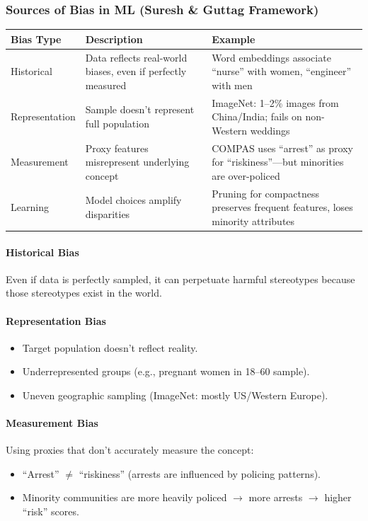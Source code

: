 \subsubsection*{Sources of Bias in ML (Suresh \& Guttag Framework)}

\begin{center}
\renewcommand{\arraystretch}{1.4}
\begin{tabular}{@{} l p{5cm} p{5cm} @{}}
\toprule
\textbf{Bias Type} & \textbf{Description} & \textbf{Example} \\
\midrule
Historical & Data reflects real-world biases, even if perfectly measured & Word embeddings associate ``nurse'' with women, ``engineer'' with men \\
Representation & Sample doesn't represent full population & ImageNet: 1--2\% images from China/India; fails on non-Western weddings \\
Measurement & Proxy features misrepresent underlying concept & COMPAS uses ``arrest'' as proxy for ``riskiness''---but minorities are over-policed \\
Learning & Model choices amplify disparities & Pruning for compactness preserves frequent features, loses minority attributes \\
\bottomrule
\end{tabular}
\end{center}

\paragraph*{Historical Bias}
Even if data is perfectly sampled, it can perpetuate harmful stereotypes because those stereotypes exist in the world.

\paragraph*{Representation Bias}
\begin{itemize}
  \item Target population doesn't reflect reality.
  \item Underrepresented groups (e.g., pregnant women in 18--60 sample).
  \item Uneven geographic sampling (ImageNet: mostly US/Western Europe).
\end{itemize}

\paragraph*{Measurement Bias}
Using proxies that don't accurately measure the concept:
\begin{itemize}
  \item ``Arrest'' $\neq$ ``riskiness'' (arrests are influenced by policing patterns).
  \item Minority communities are more heavily policed $\to$ more arrests $\to$ higher ``risk'' scores.
\end{itemize}

